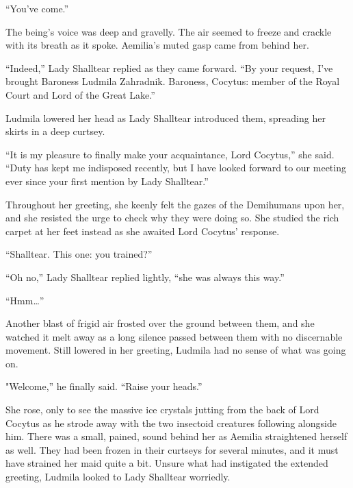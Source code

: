  

“You’ve come.”

 

The being’s voice was deep and gravelly. The air seemed to freeze and crackle with its breath as it spoke. Aemilia’s muted gasp came from behind her.

 

“Indeed,” Lady Shalltear replied as they came forward. “By your request, I’ve brought Baroness Ludmila Zahradnik. Baroness, Cocytus: member of the Royal Court and Lord of the Great Lake.”

 

Ludmila lowered her head as Lady Shalltear introduced them, spreading her skirts in a deep curtsey.

 

“It is my pleasure to finally make your acquaintance, Lord Cocytus,” she said. “Duty has kept me indisposed recently, but I have looked forward to our meeting ever since your first mention by Lady Shalltear.”

 

Throughout her greeting, she keenly felt the gazes of the Demihumans upon her, and she resisted the urge to check why they were doing so. She studied the rich carpet at her feet instead as she awaited Lord Cocytus’ response.

 

“Shalltear. This one: you trained?”

 

“Oh no,” Lady Shalltear replied lightly, “she was always this way.”

 

“Hmm…”

 

Another blast of frigid air frosted over the ground between them, and she watched it melt away as a long silence passed between them with no discernable movement. Still lowered in her greeting, Ludmila had no sense of what was going on.

 

"Welcome,” he finally said. “Raise your heads.”

 

She rose, only to see the massive ice crystals jutting from the back of Lord Cocytus as he strode away with the two insectoid creatures following alongside him. There was a small, pained, sound behind her as Aemilia straightened herself as well. They had been frozen in their curtseys for several minutes, and it must have strained her maid quite a bit. Unsure what had instigated the extended greeting, Ludmila looked to Lady Shalltear worriedly.

